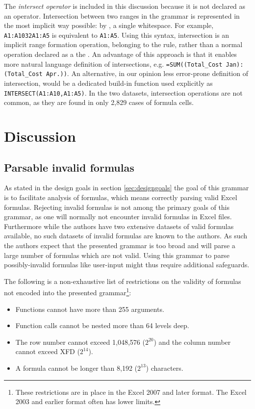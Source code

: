 \documentclass[conference]{IEEEtran}
\begin{document}
The \textit{intersect operator} is included in this discussion because it is not declared as an operator. Intersection between two ranges in the grammar is represented in the most implicit way possible: by \texttt{}, a single whitespace. For example, \texttt{A1:A10\char32A1:A5} is equivalent to \texttt{A1:A5}. Using this syntax, intersection is an implicit range formation operation, belonging to the  rule, rather than a normal operation declared as a the . An advantage of this approach is that it enables more natural language definition of intersections, e.g.  \texttt{=SUM((Total_Cost Jan):(Total_Cost Apr.))}. An alternative, in our opinion less error-prone definition of intersection, would be a dedicated build-in function used explicitly as \texttt{INTERSECT(A1:A10,A1:A5)}. In the two datasets, intersection operations are not common, as they are found in only 2,829 cases of formula cells.

\section{Discussion}
\label{sec:discussion}

\subsection{Parsable invalid formulas}

As stated in the design goals in section \ref{sec:designgoals} the goal of this grammar is to facilitate analysis of formulas, which means correctly parsing valid Excel formulas.
Rejecting invalid formulas is not among the primary goals of this grammar, as one will normally not encounter invalid formulas in Excel files.
Furthermore while the authors have two extensive datasets of valid formulas available, no such datasets of invalid formulas are known to the authors.
As such the authors expect that the presented grammar is too broad and will parse a large number of formulas which are not valid.
Using this grammar to parse possibly-invalid formulas like user-input might thus require additional safeguards.

The following is a non-exhaustive list of restrictions on the validity of formulas not encoded into the presented grammar\footnote{These restrictions are in place in the Excel 2007 and later format. The Excel 2003 and earlier format often has lower limits.}:

\begin{itemize}
	\item Functions cannot have more than 255 arguments.
	\item Function calls cannot be nested more than 64 levels deep.
	\item The row number cannot exceed 1,048,576 ($2^{20}$) and the column number cannot exceed XFD ($2^{14}$).
	\item A formula cannot be longer than 8,192 ($2^{13}$) characters.
\end{itemize}
\end{document}
